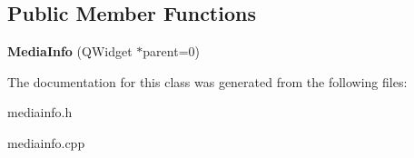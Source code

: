 \subsection*{Public Member Functions}
\begin{DoxyCompactItemize}
\item 
\hypertarget{class_media_info_a80b7af5a999c7ab31e4207c39ccb8833}{{\bfseries Media\-Info} (Q\-Widget $\ast$parent=0)}\label{class_media_info_a80b7af5a999c7ab31e4207c39ccb8833}

\end{DoxyCompactItemize}


The documentation for this class was generated from the following files\-:\begin{DoxyCompactItemize}
\item 
mediainfo.\-h\item 
mediainfo.\-cpp\end{DoxyCompactItemize}
